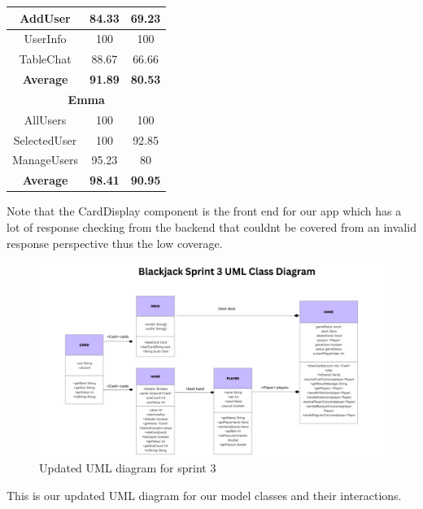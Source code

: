 \begin{table}[!hbt]
\begin{tabular}{|ccc|}
\multicolumn{1}{|c|}{AddUser}          & \multicolumn{1}{c|}{84.33}          & 69.23          \\ \hline
\multicolumn{1}{|c|}{UserInfo}         & \multicolumn{1}{c|}{100}            & 100            \\ \hline
\multicolumn{1}{|c|}{TableChat}        & \multicolumn{1}{c|}{88.67}          & 66.66          \\ \hline
\multicolumn{1}{|c|}{\textbf{Average}} & \multicolumn{1}{c|}{\textbf{91.89}} & \textbf{80.53} \\ \hline
\multicolumn{3}{|c|}{\textbf{Emma}}                                                           \\ \hline
\multicolumn{1}{|c|}{AllUsers}         & \multicolumn{1}{c|}{100}            & 100            \\ \hline
\multicolumn{1}{|c|}{SelectedUser}     & \multicolumn{1}{c|}{100}            & 92.85          \\ \hline
\multicolumn{1}{|c|}{ManageUsers}      & \multicolumn{1}{c|}{95.23}          & 80             \\ \hline
\multicolumn{1}{|c|}{\textbf{Average}} & \multicolumn{1}{c|}{\textbf{98.41}} & \textbf{90.95} \\ \hline
\end{tabular}
\end{table}
\label{sprint 3 testing}

\noindent Note that the CardDisplay component is the front end for our app which has a lot of response checking from the backend that couldnt be covered from an invalid response perspective thus the low coverage.

\pagebreak


\begin{figure}
    \centering
    \includegraphics[width=0.5\linewidth]{figures/Sprint_3_UML_Diagram.png}
    \caption{Updated UML diagram for sprint 3}
    \label{fig:sprint 3 UML}
\end{figure}

\noindent This is our updated UML diagram for our model classes and their interactions.


